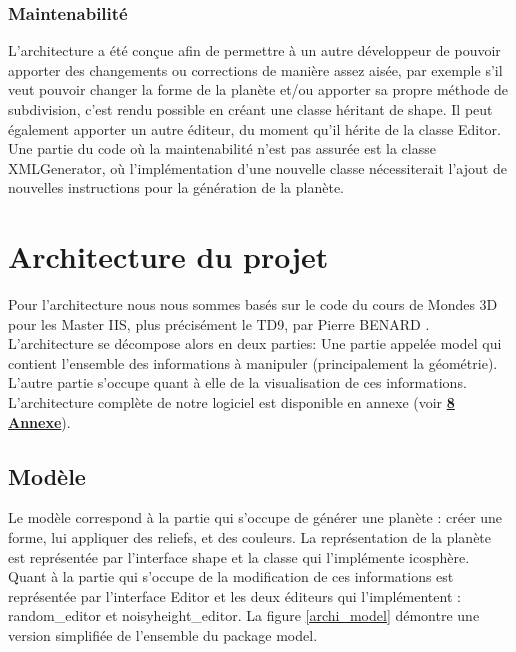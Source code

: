 \documentclass[a4paper]{article}
\begin{document}
\subsubsection{Maintenabilité}
L'architecture a été conçue afin de permettre à un autre développeur de pouvoir apporter des changements ou corrections de manière assez aisée, par exemple s'il veut pouvoir changer la forme de la planète et/ou apporter sa propre méthode de subdivision, c'est rendu possible en créant une classe héritant de shape.
Il peut également apporter un autre éditeur, du moment qu'il hérite de la classe Editor.
Une partie du code où la maintenabilité n'est pas assurée est la classe XMLGenerator, où l'implémentation d'une nouvelle classe nécessiterait l'ajout de nouvelles instructions pour la génération de la planète.
\newpage 
\section{Architecture du projet}


Pour l'architecture nous nous sommes basés sur le code du cours de Mondes 3D pour les Master IIS, plus précisément le TD9, par Pierre BENARD \cite{TD_3D}. L'architecture se décompose alors en deux parties: Une partie appelée model qui contient l'ensemble des informations à manipuler (principalement la géométrie). L'autre partie s'occupe quant à elle de la visualisation de ces informations. L'architecture complète de notre logiciel est disponible en annexe (voir \hyperref[archiComplete]{\textbf{8 Annexe}}). 
\\


\subsection{Modèle}
Le modèle correspond à la partie qui s'occupe de générer une planète : créer une forme, lui appliquer des reliefs, et des couleurs. La représentation de la planète est représentée par l'interface shape et la classe qui l'implémente icosphère. Quant à la partie qui s'occupe de la modification de ces informations est représentée par l'interface Editor et les deux éditeurs qui l'implémentent : random\_editor et noisyheight\_editor. La figure \ref{archi_model} démontre une version simplifiée de l'ensemble du package model.\\
\end{document}
